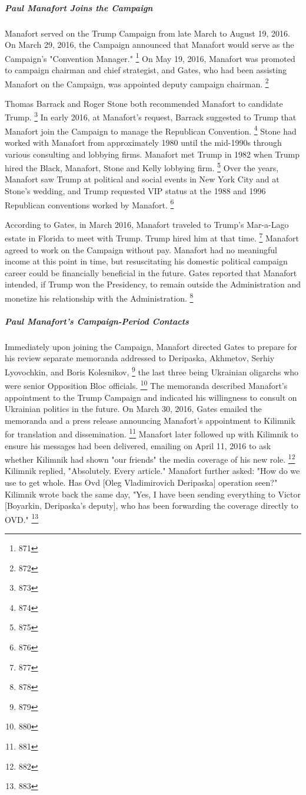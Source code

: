 \subparagraph{Paul Manafort Joins the Campaign}

Manafort served on the Trump Campaign from late March to August 19, 2016.
On March 29, 2016, the Campaign announced that Manafort would serve as the Campaign's "Convention Manager."%
\footnote{871}
On May 19, 2016, Manafort was promoted to campaign chairman and chief strategist, and Gates, who had been assisting Manafort on the Campaign, was appointed deputy campaign chairman.%
\footnote{872}

Thomas Barrack and Roger Stone both recommended Manafort to candidate Trump.%
\footnote{873}
In early 2016, at Manafort's request, Barrack suggested to Trump that Manafort join the Campaign to manage the Republican Convention.%
\footnote{874}
Stone had worked with Manafort from approximately 1980 until the mid-1990s through various consulting and lobbying firms.
Manafort met Trump in 1982 when Trump hired the Black, Manafort, Stone and Kelly lobbying firm.%
\footnote{875}
Over the years, Manafort saw Trump at political and social events in New York City and at Stone's wedding, and Trump requested VIP status at the 1988 and 1996 Republican conventions worked by Manafort.%
\footnote{876}

According to Gates, in March 2016, Manafort traveled to Trump's Mar-a-Lago estate in Florida to meet with Trump.
Trump hired him at that time.%
\footnote{877}
Manafort agreed to work on the Campaign without pay.
Manafort had no meaningful income at this point in time, but resuscitating his domestic political campaign career could be financially beneficial in the future.
Gates reported that Manafort intended, if Trump won the Presidency, to remain outside the Administration and monetize his relationship with the Administration.%
\footnote{878}

\subparagraph{Paul Manafort's Campaign-Period Contacts}

Immediately upon joining the Campaign, Manafort directed Gates to prepare for his review separate memoranda addressed to Deripaska, Akhmetov, Serhiy Lyovochkin, and Boris Kolesnikov,%
\footnote{879}
the last three being Ukrainian oligarchs who were senior Opposition Bloc officials.%
\footnote{880}
The memoranda described Manafort's appointment to the Trump Campaign and indicated his willingness to consult on Ukrainian politics in the future.
On March 30, 2016, Gates emailed the memoranda and a press release announcing Manafort's appointment to Kilimnik for translation and dissemination.%
\footnote{881}
Manafort later followed up with Kilimnik to ensure his messages had been delivered, emailing on April 11, 2016 to ask whether Kilimnik had shown "our friends" the media coverage of his new role.%
\footnote{882}
Kilimnik replied, "Absolutely.
Every article."
Manafort further asked: "How do we use to get whole.
Has Ovd [Oleg Vladimirovich Deripaska] operation seen?"
Kilimnik wrote back the same day, "Yes, I have been sending everything to Victor [Boyarkin, Deripaska's deputy], who has been forwarding the coverage directly to OVD."%
\footnote{883}

